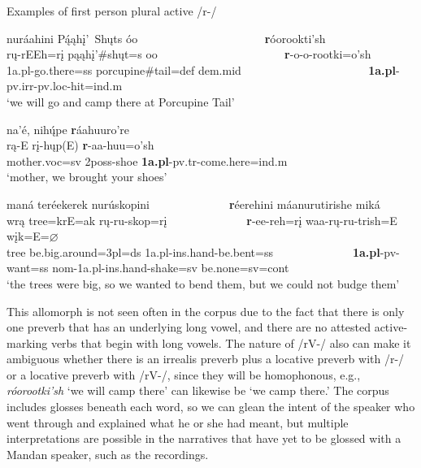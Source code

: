 \newpage
\begin{exe}

\item\label{ExRonly} Examples of first person plural active /r-/

	\begin{xlist}
	
	\item \glll nuráahini Pą́ąhį'~Shųts óo ~ ~ ~ ~ ~ ~ ~ ~ ~ ~ ~ ~ ~ \textbf{r}óorookti'sh\\
	rų-rEEh=rį pąąhį'\#shųt=s oo ~ ~ ~ ~ ~ ~ ~ ~ ~ ~ ~ ~ ~  \textbf{r}-o-o-rootki=o'sh\\
	1a.pl-\textnormal{go.there}=ss \textnormal{porcupine}\#\textnormal{tail}=def dem.mid ~ ~ ~ ~ ~ ~ ~ ~ ~ ~ ~ ~ ~ \textbf{1a.pl}-pv.irr-pv.loc-\textnormal{hit}=ind.m\\
	\glt `we will go and camp there at Porcupine Tail' \citep[254]{hollow1973b}
	
	\item \glll na'é, nihų́pe \textbf{r}áahuuro're\\
	rą-E rį-hųp(E) \textbf{r}-aa-huu=o'sh\\
	\textnormal{mother}.voc=sv 2poss-\textnormal{shoe} \textbf{1a.pl}-pv.tr-\textnormal{come.here}=ind.m\\
	\glt `mother, we brought your shoes' \citep[147]{hollow1973a}
	
	\item \glll maná teréekerek nurúskopini ~ ~ ~ ~ ~ ~ ~ ~ \textbf{r}éerehini máanurutirishe miká\\
	wrą tree=krE=ak rų-ru-skop=rį ~ ~ ~ ~ ~ ~ ~ ~  \textbf{r}-ee-reh=rį waa-rų-ru-trish=E wįk=E=$\varnothing$\\
	\textnormal{tree} \textnormal{be.big.around}=3pl=ds 1a.pl-ins.hand-\textnormal{be.bent}=ss ~ ~ ~ ~ ~ ~ ~ ~  \textbf{1a.pl}-pv-\textnormal{want}=ss nom-1a.pl-ins.hand-\textnormal{shake}=sv \textnormal{be.none}=sv=cont\\
	\glt `the trees were big, so we wanted to bend them, but we could not budge them' \citep[52]{hollow1973a}

	\end{xlist}
	
\end{exe}

This allomorph is not seen often in the corpus due to the fact that there is only one preverb that has an underlying long vowel, and there are no attested active-marking verbs that begin with long vowels. The nature of /rV-/ also can make it ambiguous whether there is an irrealis preverb plus a locative preverb with /r-/ or a locative preverb with /rV-/, since they will be homophonous, e.g., \textit{róorootki'sh
} `we will camp there' can likewise be `we camp there.' The corpus includes glosses beneath each word, so we can glean the intent of the speaker who went through and explained what he or she had meant, but multiple interpretations are possible in the narratives that have yet to be glossed with a Mandan speaker, such as the \citet{bowers1971} recordings.

